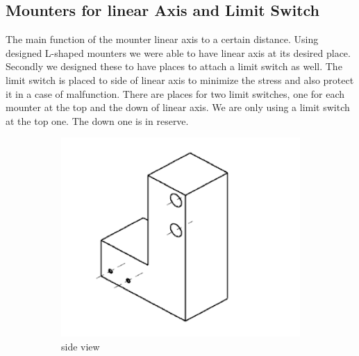 \documentclass[a4paper,12pt]{scrreprt}
\begin{document}
\subsection{Mounters for linear Axis and Limit Switch}
The main function of the mounter linear axis to a certain distance. Using designed L-shaped mounters we were able to have linear axis at its desired place. Secondly we designed these to have places to attach a limit switch as well. The limit switch is placed to side of linear axis to minimize the stress and also protect it in a case of malfunction. There are places for two limit switches, one for each mounter at the top and the down of linear axis. We are only using a limit switch at the top one. The down one is in reserve. 
  \begin{figure} [H]
        \centering
        \begin{subfigure}[b]{0.45\textwidth}
                \centering
                \includegraphics[width=1.3\textwidth]{pictures/linear_axis_1}
                \caption{side view}\label{fig:linear_axis_1}
        \end{subfigure}%
        ~ %
        \begin{subfigure}[b]{0.45\textwidth}
                \centering

\end{subfigure}
\end{figure}
\end{document}
